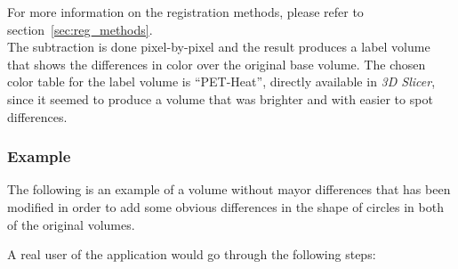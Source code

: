 For more information on the registration methods, please refer to
section~\ref{sec:reg_methods}.\\

The subtraction is done pixel-by-pixel and the result produces a label
volume that shows the differences in color over the original base
volume. The chosen color table for the label volume is ``PET-Heat'',
directly available in \textit{3D Slicer}, since it seemed to produce a
volume that was brighter and with easier to spot differences.

\subsubsection{Example}
The following is an example of a volume without mayor differences that
has been modified in order to add some obvious differences in the
shape of circles in both of the original volumes. 

A real user of the application would go through the following steps:

